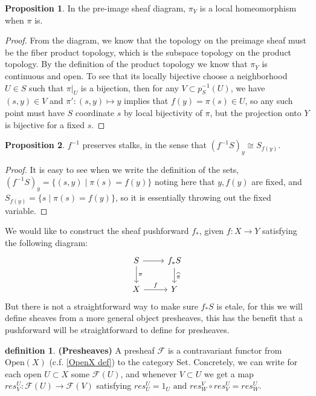 \documentclass[10.5pt]{article}
\theoremstyle{definition}
\newtheorem{proposition}{Proposition}
\newtheorem{definition}{definition}
\newcommand{\set}[1]{\{#1\}}
\newcommand{\tand}{\text{ and }}
\begin{document}
    \begin{proposition}
        In the pre-image sheaf diagram, \(\pi_Y\) is a local homeomorphism when \(\pi\) is.
    \end{proposition}
    \begin{proof}
        From the diagram, we know that the topology on the preimage sheaf must be the fiber product topology, which is the subspace topology on the product topology. By the definition of the product topology we know that \(\pi_Y\) is continuous and open. To see that its locally bijective choose a neighborhood \(U \in S\) such that \(\pi\vert_U\) is a bijection, then for any \(V \subset p_S^{-1}(U)\), we have \((s,y) \in V\) and \(\pi': (s,y) \mapsto y\) implies that \(f(y) = \pi(s) \in U\), so any such point must have \(S\) coordinate \(s\) by local bijectivity of \(\pi\), but the projection onto \(Y\) is bijective for a fixed \(s\).
    \end{proof}
    \begin{proposition}
        \(f^{-1}\) preserves stalks, in the sense that \((f^{-1}S)_y \cong S_{f(y)}\).
    \end{proposition}
    \begin{proof}
        It is easy to see when we write the definition of the sets, \((f^{-1}S)_y = \set{(s,y) \mid \pi(s) = f(y)}\) noting here that \(y,f(y)\) are fixed, and \(S_{f(y)} = \set{s \mid \pi(s) = f(y)}\), so it is essentially throwing out the fixed variable.
    \end{proof}
    We would like to construct the sheaf pushforward \(f_*\), given \(f: X\to Y\) satisfying the following diagram:
    \begin{equation*}
            \begin{tikzcd}
                S \arrow[r] \arrow[d,"\pi"] &f_*S \arrow[d,"\widehat{\pi}"] \\ X \arrow[r,"f"] & Y
            \end{tikzcd} 
    \end{equation*}
    But there is not a straightforward way to make sure \(f_*S\) is etale, for this we will define sheaves from a more general object presheaves, this has the benefit that a pushforward will be straightforward to define for presheaves.
    \begin{definition}
        \textbf{(Presheaves)} A presheaf \(\mathcal{F}\) is a contravariant functor from \(\text{Open}(X)\) (c.f. \ref{OpenX def}) to the category Set. Concretely, we can write for each open \(U \subset X\) some \(\mathcal{F}(U)\), and whenever \(V \subset U\) we get a map \(res^U_V: \mathcal{F}(U) \to \mathcal{F}(V)\) satisfying \(res_U^U = 1_U \tand res_W^V \circ res_V^U  = res_W^U\).
    \end{definition}
\end{document}
